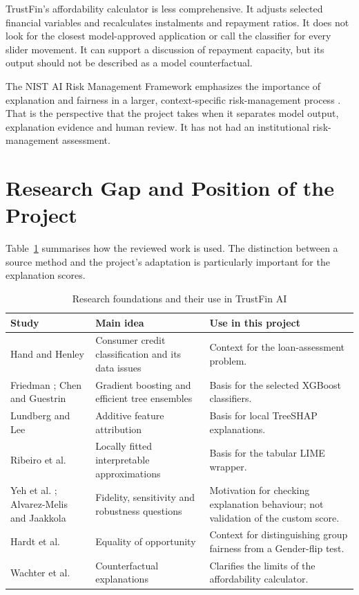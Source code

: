 TrustFin's affordability calculator is less comprehensive. It adjusts selected financial variables and recalculates instalments and repayment ratios. It does not look for the closest model-approved application or call the classifier for every slider movement. It can support a discussion of repayment capacity, but its output should not be described as a model counterfactual.

The NIST AI Risk Management Framework emphasizes the importance of explanation and fairness in a larger, context-specific risk-management process \cite{nistAirmf2023}. That is the perspective that the project takes when it separates model output, explanation evidence and human review. It has not had an institutional risk-management assessment.

\section{Research Gap and Position of the Project}
Table~\ref{tab:literature-comparison} summarises how the reviewed work is used. The distinction between a source method and the project's adaptation is particularly important for the explanation scores.

\begin{table}[htbp]
\centering\small
\caption{Research foundations and their use in TrustFin AI}\label{tab:literature-comparison}
\begin{tabularx}{\textwidth}{p{3.3cm}XX}
\toprule
Study & Main idea & Use in this project\\\midrule
Hand and Henley \cite{handHenley1997} & Consumer credit classification and its data issues & Context for the loan-assessment problem.\\
Friedman \cite{friedman2001}; Chen and Guestrin \cite{chen2016} & Gradient boosting and efficient tree ensembles & Basis for the selected XGBoost classifiers.\\
Lundberg and Lee \cite{lundberg2017} & Additive feature attribution & Basis for local TreeSHAP explanations.\\
Ribeiro et al. \cite{ribeiro2016} & Locally fitted interpretable approximations & Basis for the tabular LIME wrapper.\\
Yeh et al. \cite{yeh2019}; Alvarez-Melis and Jaakkola \cite{alvarezm2018} & Fidelity, sensitivity and robustness questions & Motivation for checking explanation behaviour; not validation of the custom score.\\
Hardt et al. \cite{hardt2016} & Equality of opportunity & Context for distinguishing group fairness from a Gender-flip test.\\
Wachter et al. \cite{wachter2018} & Counterfactual explanations & Clarifies the limits of the affordability calculator.\\\bottomrule
\end{tabularx}
\end{table}

